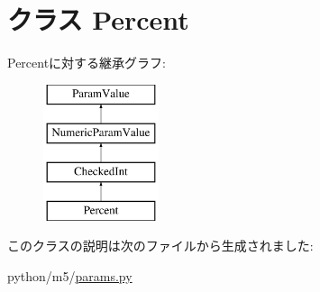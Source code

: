 \hypertarget{classm5_1_1params_1_1Percent}{
\section{クラス Percent}
\label{classm5_1_1params_1_1Percent}
}
Percentに対する継承グラフ:\begin{figure}[H]
\begin{center}
\leavevmode
\includegraphics[height=4cm]{classm5_1_1params_1_1Percent}
\end{center}
\end{figure}


このクラスの説明は次のファイルから生成されました:\begin{DoxyCompactItemize}
\item 
python/m5/\hyperlink{params_8py}{params.py}\end{DoxyCompactItemize}
